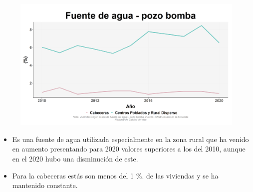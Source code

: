     \begin{figure}[H]
        \caption[Pozo con bomba como fuentes de agua por zonas ]{\label{pozo_bomba_zonas} }
        \begin{center}
        \includegraphics[width=\textwidth,keepaspectratio]{img/var_136_trend.png}
        \end{center}
    \end{figure}
            \begin{itemize}
                    \item Es una fuente de agua utilizada especialmente en la zona rural que ha venido en aumento presentando para 2020 valores superiores a los del 2010, aunque en el 2020 hubo una disminución de este.
                    \item Para la cabeceras estás son menos del 1 \%. de las viviendas y se ha mantenido constante.
                    \end{itemize}

